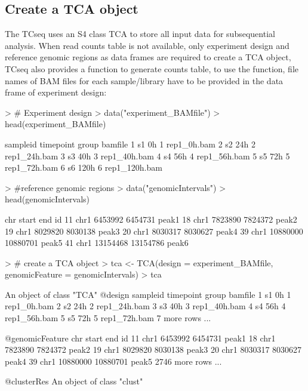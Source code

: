 \documentclass[a4paper]{article}
\begin{document}
\subsection{Create a TCA object}
The TCseq uses an S4 class TCA to store all input data for subsequential analysis. When read counts table is not available, only experiment design and reference genomic regions as data frames are required to create a TCA object, TCseq also provides a function to generate counts table, to use the function, file names of BAM files for each sample/library have to be provided in the data frame of experiment design:
\begin{Schunk}
\begin{Sinput}
> # Experiment design
> data("experiment_BAMfile")
> head(experiment_BAMfile)
\end{Sinput}
\begin{Soutput}
  sampleid timepoint group       bamfile
1       s1        0h     1   rep1_0h.bam
2       s2       24h     2  rep1_24h.bam
3       s3       40h     3  rep1_40h.bam
4       s4       56h     4  rep1_56h.bam
5       s5       72h     5  rep1_72h.bam
6       s6      120h     6 rep1_120h.bam
\end{Soutput}
\begin{Sinput}
> #reference genomic regions
> data("genomicIntervals")
> head(genomicIntervals)
\end{Sinput}
\begin{Soutput}
    chr    start      end    id
11 chr1  6453992  6454731 peak1
18 chr1  7823890  7824372 peak2
19 chr1  8029820  8030138 peak3
20 chr1  8030317  8030627 peak4
39 chr1 10880000 10880701 peak5
41 chr1 13154468 13154786 peak6
\end{Soutput}
\begin{Sinput}
> # create a TCA object
> tca <- TCA(design = experiment_BAMfile, genomicFeature = genomicIntervals)
> tca
\end{Sinput}
\begin{Soutput}
An object of class "TCA"
@design
  sampleid timepoint group      bamfile
1       s1        0h     1  rep1_0h.bam
2       s2       24h     2 rep1_24h.bam
3       s3       40h     3 rep1_40h.bam
4       s4       56h     4 rep1_56h.bam
5       s5       72h     5 rep1_72h.bam
7 more rows ...

@genomicFeature
    chr    start      end    id
11 chr1  6453992  6454731 peak1
18 chr1  7823890  7824372 peak2
19 chr1  8029820  8030138 peak3
20 chr1  8030317  8030627 peak4
39 chr1 10880000 10880701 peak5
2746 more rows ...

@clusterRes
An object of class "clust"
\end{Soutput}
\end{Schunk}
\end{document}
